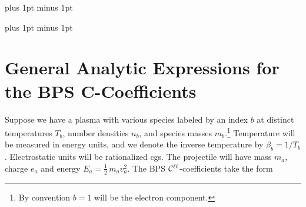 \documentclass[preprint,12pt,eqsecnum,nofootinbib,amsmath,amssymb]{revtex4}
\newcommand{\bodyskip}{\baselineskip 18pt plus 1pt minus 1pt}
\newcommand{\tableofcontentsskip}{\baselineskip 14pt plus 1pt minus 1pt}
\begin{document}

\pagebreak
\tableofcontentsskip
\tableofcontents

\newpage
\bodyskip

\pagebreak
\clearpage

\section{General Analytic Expressions for the BPS C-Coefficients}

Suppose we have a plasma with various species labeled by an index $b$
at distinct temperatures $T_b$, number densities $n_b$, and species
masses $m_b$.\footnote{By convention $b=1$ will be the electron
component.}  Temperature will be measured in energy units, and we
denote the inverse temperature by $\beta_b =1/T_b$. Electrostatic
units will be rationalized cgs. The projectile will have mass $m_a$,
charge $e_a$ and energy $E_a = \frac{1}{2}\, m_a v_a^2$.  The BPS
${\cal C^{\ell\ell}}$-coefficients take the form
\end{document}
